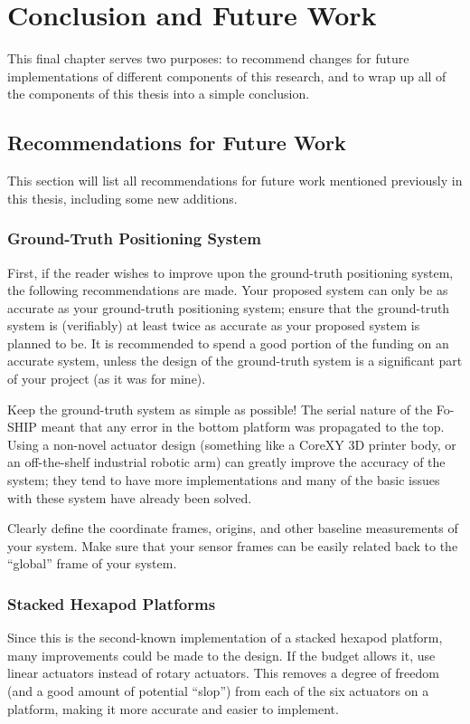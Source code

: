 \documentclass[11pt]{ucthesisCP}
\begin{document}





\chapter{Conclusion and Future Work} \label{chap:7c}
This final chapter serves two purposes: to recommend changes for future implementations of different components of this research, and to wrap up all of the components of this thesis into a simple conclusion.

\section{Recommendations for Future Work} \label{sec:7s1}
This section will list all recommendations for future work mentioned previously in this thesis, including some new additions.

\subsection{Ground-Truth Positioning System} \label{sec:7s1s1}
First, if the reader wishes to improve upon the ground-truth positioning system, the following recommendations are made. Your proposed system can only be as accurate as your ground-truth positioning system; ensure that the ground-truth system is (verifiably) at least twice as accurate as your proposed system is planned to be. It is recommended to spend a good portion of the funding on an accurate system, unless the design of the ground-truth system is a significant part of your project (as it was for mine). 

Keep the ground-truth system as simple as possible! The serial nature of the Fo-SHIP meant that any error in the bottom platform was propagated to the top. Using a non-novel actuator design (something like a CoreXY 3D printer body, or an off-the-shelf industrial robotic arm) can greatly improve the accuracy of the system; they tend to have more implementations and many of the basic issues with these system have already been solved.

Clearly define the coordinate frames, origins, and other baseline measurements of your system. Make sure that your sensor frames can be easily related back to the “global” frame of your system.

\subsection{Stacked Hexapod Platforms} \label{sec:7s1s2}
Since this is the second-known implementation of a stacked hexapod platform, many improvements could be made to the design. If the budget allows it, use linear actuators instead of rotary actuators. This removes a degree of freedom (and a good amount of potential “slop”) from each of the six actuators on a platform, making it more accurate and easier to implement.
\end{document}
